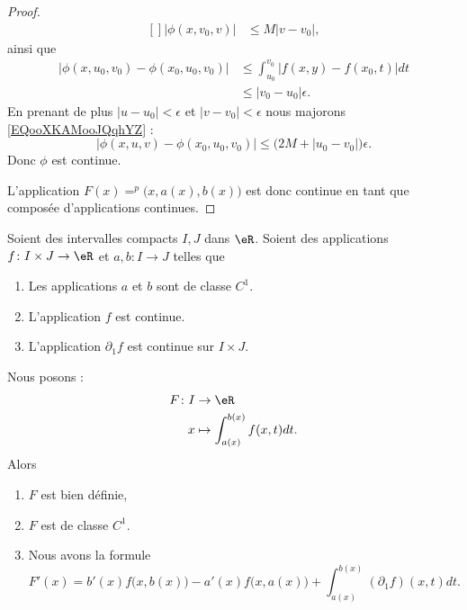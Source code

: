 \begin{proof}
\begin{equation}
\begin{aligned}[]
			| \phi(x,v_0,v) | & \leq M| v-v_0 |,
		\end{aligned}
	\end{equation}
	ainsi que
	\begin{subequations}
		\begin{align}
			| \phi(x,u_0,v_0)-\phi(x_0,u_0,v_0) | & \leq \int_{u_0}^{v_0}| f(x,y)-f(x_0,t) |dt \\
			                                      & \leq | v_0-u_0 |\epsilon.
		\end{align}
	\end{subequations}
	En prenant de plus \( | u-u_0 |<\epsilon\) et \( | v-v_0 |<\epsilon\) nous majorons \eqref{EQooXKAMooJQqhYZ} :
	\begin{equation}
		| \phi(x,u,v)-\phi(x_0,u_0,v_0) |\leq \big( 2M+| u_0-v_0 | \big)\epsilon.
	\end{equation}
	Donc \( \phi\) est continue.

	L'application \( F(x)=^p\big( x,a(x),b(x) \big)\) est donc continue en tant que composée d'applications continues.
\end{proof}

\begin{theorem}	  \label{THOooZPUYooQAlUTa}
	Soient des intervalles compacts \( I,J\) dans \( \eR\). Soient des applications \(f \colon I\times J\to \eR  \) et \(a,b \colon I\to J  \) telles que
	\begin{enumerate}
		\item
		      Les applications \( a\) et \( b\) sont de classe \( C^1\).
		\item
		      L'application \( f\) est continue.
		\item
		      L'application \( \partial_1f \) est continue sur \( I\times J\).
	\end{enumerate}
	Nous posons :
	\begin{equation}
		\begin{aligned}
			F\colon I & \to \eR                             \\
			x         & \mapsto \int_{a(x)}^{b(x)}f(x,t)dt.
		\end{aligned}
	\end{equation}
	Alors
	\begin{enumerate}
		\item
		      \( F\) est bien définie,
		\item
		      \( F\) est de classe \( C^1\).
		\item
		      Nous avons la formule
		      \begin{equation}
			      F'(x)=b'(x)f\big( x,b(x) \big)-a'(x)f\big( x,a(x) \big)+\int_{a(x)}^{b(x)}(\partial_1f)(x,t)dt.
		      \end{equation}
	\end{enumerate}
\end{theorem}

